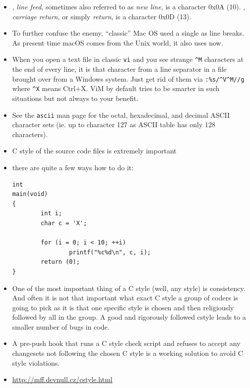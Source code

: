 \begin{itemize}
\item {}, \emph{line feed}, sometimes also referred to as \emph{new
line}, is a character 0x0A (10).  , \emph{carriage return}, or simply
\emph{return}, is a character 0x0D (13).
\item To further confuse the enemy, ``classic'' Mac OS used a single 
as line breaks.  As present time macOS comes from the Unix world, it also uses
 now.
\item When you open a text file in classic \texttt{vi} and you see strange
\verb|^M| characters at the end of every line, it is that  character
from a line separator in a file brought over from a Windows system.  Just get
rid of them via \verb|:%s/^V^M//g| where \verb|^X| means Ctrl+X.  ViM by default
tries to be smarter in such situations but not always to your benefit.
\item See the \texttt{ascii} man page for the octal, hexadecimal, and decimal
ASCII character sets (ie. up to character 127 as ASCII table has only 128
characters).
\end{itemize}



\begin{slide}
\begin{itemize}
\item C style of the source code files is extremely important
\item there are quite a few ways how to do it:

\begin{verbatim}
int
main(void)
{
        int i;
        char c = 'X';

        for (i = 0; i < 10; ++i)
                printf("%c%d\n", c, i);
        return (0);
}
\end{verbatim}
\end{itemize}
\end{slide}

\begin{itemize}
\item One of the most important thing of a C style (well, any style) is
consistency.  And often it is not that important what exact C style a group
of coders is going to pick as it is that one specific style is chosen and then
religiously followed by all in the group.  A good and rigorously followed cstyle
leads to a smaller number of bugs in code.
\item A pre-push hook that runs a C style check script and refuses to accept any
changesets not following the chosen C style is a working solution to avoid C
style violations.
\item \url{http://mff.devnull.cz/cstyle.html}
\end{itemize}

